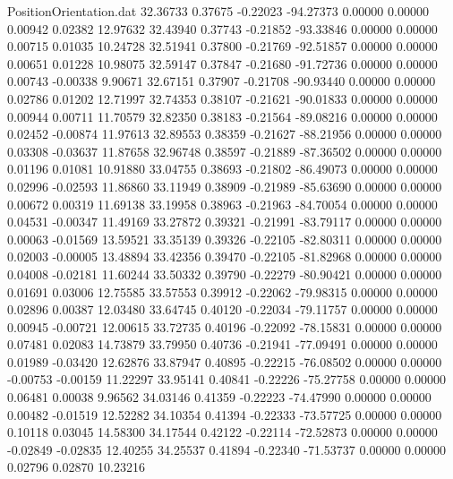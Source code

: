 \begin{filecontents}{PositionOrientation.dat}
  32.36733    0.37675   -0.22023   -94.27373    0.00000    0.00000    0.00942    0.02382   12.97632
  32.43940    0.37743   -0.21852   -93.33846    0.00000    0.00000    0.00715    0.01035   10.24728
  32.51941    0.37800   -0.21769   -92.51857    0.00000    0.00000    0.00651    0.01228   10.98075
  32.59147    0.37847   -0.21680   -91.72736    0.00000    0.00000    0.00743   -0.00338    9.90671
  32.67151    0.37907   -0.21708   -90.93440    0.00000    0.00000    0.02786    0.01202   12.71997
  32.74353    0.38107   -0.21621   -90.01833    0.00000    0.00000    0.00944    0.00711   11.70579
  32.82350    0.38183   -0.21564   -89.08216    0.00000    0.00000    0.02452   -0.00874   11.97613
  32.89553    0.38359   -0.21627   -88.21956    0.00000    0.00000    0.03308   -0.03637   11.87658
  32.96748    0.38597   -0.21889   -87.36502    0.00000    0.00000    0.01196    0.01081   10.91880
  33.04755    0.38693   -0.21802   -86.49073    0.00000    0.00000    0.02996   -0.02593   11.86860
  33.11949    0.38909   -0.21989   -85.63690    0.00000    0.00000    0.00672    0.00319   11.69138
  33.19958    0.38963   -0.21963   -84.70054    0.00000    0.00000    0.04531   -0.00347   11.49169
  33.27872    0.39321   -0.21991   -83.79117    0.00000    0.00000    0.00063   -0.01569   13.59521
  33.35139    0.39326   -0.22105   -82.80311    0.00000    0.00000    0.02003   -0.00005   13.48894
  33.42356    0.39470   -0.22105   -81.82968    0.00000    0.00000    0.04008   -0.02181   11.60244
  33.50332    0.39790   -0.22279   -80.90421    0.00000    0.00000    0.01691    0.03006   12.75585
  33.57553    0.39912   -0.22062   -79.98315    0.00000    0.00000    0.02896    0.00387   12.03480
  33.64745    0.40120   -0.22034   -79.11757    0.00000    0.00000    0.00945   -0.00721   12.00615
  33.72735    0.40196   -0.22092   -78.15831    0.00000    0.00000    0.07481    0.02083   14.73879
  33.79950    0.40736   -0.21941   -77.09491    0.00000    0.00000    0.01989   -0.03420   12.62876
  33.87947    0.40895   -0.22215   -76.08502    0.00000    0.00000   -0.00753   -0.00159   11.22297
  33.95141    0.40841   -0.22226   -75.27758    0.00000    0.00000    0.06481    0.00038    9.96562
  34.03146    0.41359   -0.22223   -74.47990    0.00000    0.00000    0.00482   -0.01519   12.52282
  34.10354    0.41394   -0.22333   -73.57725    0.00000    0.00000    0.10118    0.03045   14.58300
  34.17544    0.42122   -0.22114   -72.52873    0.00000    0.00000   -0.02849   -0.02835   12.40255
  34.25537    0.41894   -0.22340   -71.53737    0.00000    0.00000    0.02796    0.02870   10.23216

\end{filecontents}
